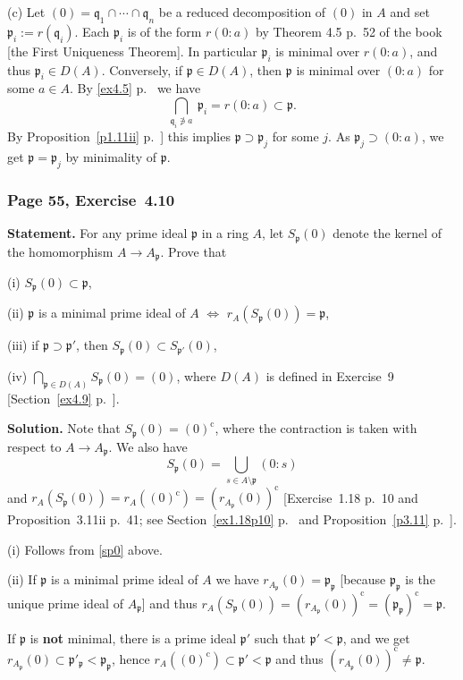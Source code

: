 \documentclass[12pt,letterpaper]{article}%
\newcommand{\oo}{\operatorname}\newcommand{\ooo}{\operatorname*}
\newcommand{\mf}{\mathfrak}
\newcommand{\ppp}{\mf p}
\newcommand{\qqq}{\mf q}
\newcommand{\nn}{\noindent}
\begin{document}
\nn(c) Let $(0)=\qqq_1\cap\cdots\cap\qqq_n$ be a reduced decomposition of $(0)$ in $A$ and set $\ppp_i:=r(\qqq_i)$. Each $\ppp_i$ is of the form $r(0:a)$ by Theorem 4.5 p.~52 of the book [the First Uniqueness Theorem]. In particular $\ppp_i$ is minimal over $r(0:a)$, and thus $\ppp_i\in D(A)$. Conversely, if $\ppp\in D(A)$, then $\ppp$ is minimal over $(0:a)$ for some $a\in A$. By \eqref{ex4.5} p.~\pageref{ex4.5} we have 
$$
\bigcap_{\qqq_i\not\ni a}\ \ppp_i=r(0:a)\subset\ppp.
$$ 
By Proposition~\ref{p1.11ii} p.~\pageref{p1.11ii}] this implies $\ppp\supset\ppp_j$ for some $j$. As $\ppp_j\supset(0:a)$, we get $\ppp=\ppp_j$ by minimality of $\ppp$.

\subsubsection{Page 55, Exercise~4.10}\label{ex4.10}%

\textbf{Statement.} For any prime ideal $\ppp$ in a ring $A$, let $S_\ppp(0)$ denote the kernel of the homomorphism $A\to A_\ppp$. Prove that

\nn(i) $S_\ppp(0)\subset\ppp$,

\nn(ii) $\ppp$ is a minimal prime ideal of $A$ $\iff$ $r_A(S_\ppp(0))=\ppp$,

\nn(iii) if $\ppp\supset\ppp'$, then $S_\ppp(0)\subset S_{\ppp'}(0)$,

\nn(iv) $\bigcap_{\ppp\in D(A)}S_\ppp(0)=(0)$, where $D(A)$ is defined in Exercise~9 [Section~\ref{ex4.9} p.~\pageref{ex4.9}].

\nn\textbf{Solution.} Note that $S_\ppp(0)=(0)^{\oo c}$, where the contraction is taken with respect to $A\to A_\ppp$. We also have 
\begin{equation}\label{sp0}
S_\ppp(0)=\bigcup_{s\in A\setminus\ppp}(0:s)
\end{equation}  
and $r_A(S_\ppp(0))=r_A((0)^{\oo c})=(r_{A_\ppp}(0))^{\oo c}$ [Exercise~1.18 p.~10 and Proposition~3.11ii p.~41; see Section~\ref{ex1.18p10} p.~\pageref{ex1.18p10} and Proposition~\ref{p3.11} p.~\pageref{p3.11}].

\nn(i) Follows from \eqref{sp0} above.

\nn(ii) If $\ppp$ is a minimal prime ideal of $A$ we have $r_{A_\ppp}(0)=\ppp_\ppp$ [because $\ppp_\ppp$ is the unique prime ideal of $A_\ppp$] and thus $r_A(S_\ppp(0))=(r_{A_\ppp}(0))^{\oo c}=(\ppp_\ppp)^{\oo c}=\ppp$. 

If $\ppp$ is \textbf{not} minimal, there is a prime ideal $\ppp'$ such that $\ppp'<\ppp$, and we get $r_{A_\ppp}(0)\subset\ppp'_\ppp<\ppp_\ppp$, hence $r_A((0)^{\oo c})\subset\ppp'<\ppp$ and thus $(r_{A_\ppp}(0))^{\oo c}\ne\ppp$.
\end{document}
